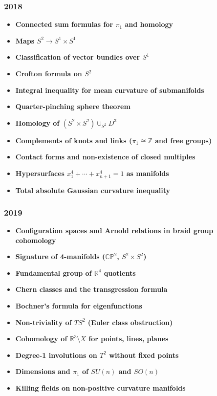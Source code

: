 \subsubsection*{2018}
\begin{itemize}
    \item \textbf{Connected sum formulas for $\pi_1$ and homology}
    \item \textbf{Maps $S^2 \to S^1 \times S^1$}
    \item \textbf{Classification of vector bundles over $S^1$}
    \item \textbf{Crofton formula on $S^2$}
    \item \textbf{Integral inequality for mean curvature of submanifolds}
    \item \textbf{Quarter-pinching sphere theorem}
    \item \textbf{Homology of $(S^2 \times S^2) \cup_{S^2} D^3$}
    \item \textbf{Complements of knots and links ($\pi_1 \cong \mathbb{Z}$ and free groups)}
    \item \textbf{Contact forms and non-existence of closed multiples}
    \item \textbf{Hypersurfaces $x_1^4 + \cdots + x_{n+1}^4 = 1$ as manifolds}
    \item \textbf{Total absolute Gaussian curvature inequality}
\end{itemize}

\subsubsection*{2019}
\begin{itemize}
    \item \textbf{Configuration spaces and Arnold relations in braid group cohomology}
    \item \textbf{Signature of 4-manifolds ($\mathbb{CP}^2$, $S^2 \times S^2$)}
    \item \textbf{Fundamental group of $\mathbb{R}^4$ quotients}
    \item \textbf{Chern classes and the transgression formula}
    \item \textbf{Bochner's formula for eigenfunctions}
    \item \textbf{Non-triviality of $TS^2$ (Euler class obstruction)}
    \item \textbf{Cohomology of $\mathbb{R}^3 \setminus X$ for points, lines, planes}
    \item \textbf{Degree-1 involutions on $T^2$ without fixed points}
    \item \textbf{Dimensions and $\pi_1$ of $SU(n)$ and $SO(n)$}
    \item \textbf{Killing fields on non-positive curvature manifolds}
\end{itemize}

